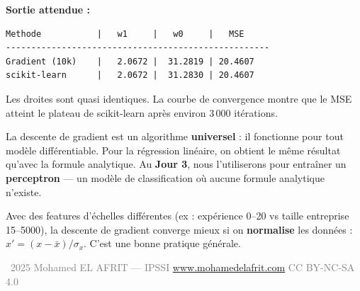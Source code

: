 \textbf{Sortie attendue :}
\begin{verbatim}
Methode           |   w1     |   w0     |   MSE
----------------------------------------------------
Gradient (10k)    |   2.0672 |  31.2819 | 20.4607
scikit-learn      |   2.0672 |  31.2830 | 20.4607
\end{verbatim}

Les droites sont quasi identiques. La courbe de convergence montre que le MSE atteint le plateau de scikit-learn apr\`{e}s environ 3\,000 it\'{e}rations.

\begin{retenirbox}
    La descente de gradient est un algorithme \textbf{universel} : il fonctionne pour tout
    mod\`{e}le diff\'{e}rentiable. Pour la r\'{e}gression lin\'{e}aire, on obtient le m\^{e}me r\'{e}sultat
    qu'avec la formule analytique. Au \textbf{Jour 3}, nous l'utiliserons pour entra\^{i}ner
    un \textbf{perceptron} --- un mod\`{e}le de classification o\`{u} aucune formule analytique n'existe.
\end{retenirbox}

\begin{intuitionbox}
    Avec des features d'\'{e}chelles diff\'{e}rentes (ex : exp\'{e}rience 0--20 vs taille entreprise 15--5000),
    la descente de gradient converge mieux si on \textbf{normalise} les donn\'{e}es :
    $x' = (x - \bar{x}) / \sigma_x$. C'est une bonne pratique g\'{e}n\'{e}rale.
\end{intuitionbox}

\vfill
\begin{center}
    {\footnotesize\sffamily\textcolor{gray}{%
        \textcopyright\ 2025 Mohamed EL AFRIT --- IPSSI \enspace\textbullet\enspace
        \url{www.mohamedelafrit.com} \enspace\textbullet\enspace
        CC BY-NC-SA 4.0
    }}
\end{center}


